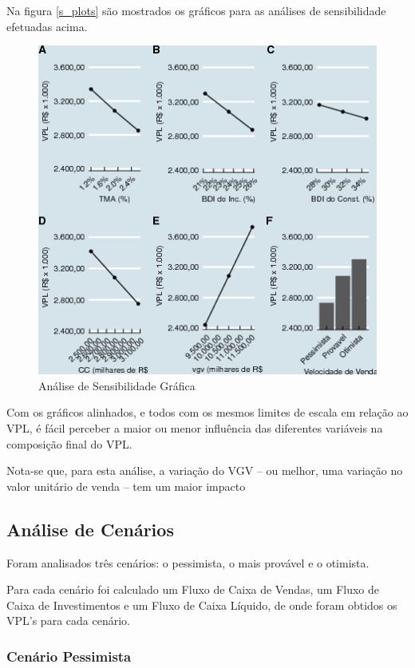 \documentclass[a4paper]{article}
\begin{document}
Na figura \ref{s_plots} são mostrados os gráficos para as análises de
sensibilidade efetuadas acima.

\begin{figure}[p]

{\centering \includegraphics[width=0.7\linewidth]{images/s_plots-1} 

}

\caption{\label{s_plots}Análise de Sensibilidade Gráfica}\label{fig:s_plots}
\end{figure}

Com os gráficos alinhados, e todos com os mesmos limites de escala em
relação ao VPL, é fácil perceber a maior ou menor influência das
diferentes variáveis na composição final do VPL.

Nota-se que, para esta análise, a variação do VGV -- ou melhor, uma
variação no valor unitário de venda -- tem um maior impacto

\subsection{Análise de Cenários}\label{analise-de-cenarios}

Foram analisados três cenários: o pessimista, o mais provável e o
otimista.

Para cada cenário foi calculado um Fluxo de Caixa de Vendas, um Fluxo de
Caixa de Investimentos e um Fluxo de Caixa Líquido, de onde foram
obtidos os VPL's para cada cenário.

\subsubsection{Cenário Pessimista}\label{cenario-pessimista}
\end{document}
